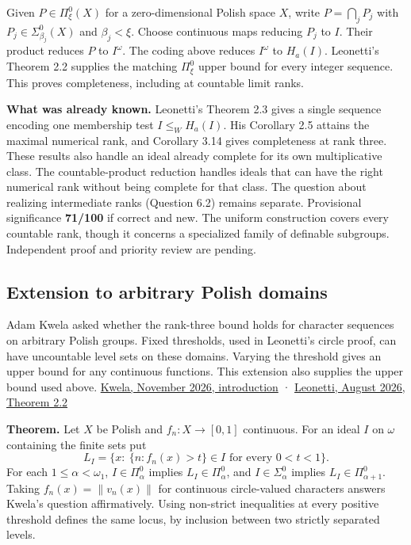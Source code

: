 \documentclass[11pt]{article}
\begin{document}
Given \(P\in\Pi^0_\xi(X)\) for a zero-dimensional Polish space \(X\), write \(P=\bigcap_j P_j\) with \(P_j\in\Sigma^0_{\beta_j}(X)\) and \(\beta_j<\xi\). Choose continuous maps reducing \(P_j\) to \(I\). Their product reduces \(P\) to \(I^\omega\). The coding above reduces \(I^\omega\) to \(H_a(I)\). Leonetti's Theorem 2.2 supplies the matching \(\Pi^0_\xi\) upper bound for every integer sequence. This proves completeness, including at countable limit ranks.

\textbf{What was already known.} Leonetti's Theorem 2.3 gives a single sequence encoding one membership test \(I\le_W H_a(I)\). His Corollary 2.5 attains the maximal numerical rank, and Corollary 3.14 gives completeness at rank three. These results also handle an ideal already complete for its own multiplicative class. The countable-product reduction handles ideals that can have the right numerical rank without being complete for that class. The question about realizing intermediate ranks (Question 6.2) remains separate. Provisional significance \textbf{71/100} if correct and new. The uniform construction covers every countable rank, though it concerns a specialized family of definable subgroups. Independent proof and priority review are pending.

\subsection{Extension to arbitrary Polish domains}\label{extension-to-arbitrary-polish-domains}

Adam Kwela asked whether the rank-three bound holds for character sequences on arbitrary Polish groups. Fixed thresholds, used in Leonetti's circle proof, can have uncountable level sets on these domains. Varying the threshold gives an upper bound for any continuous functions. This extension also supplies the upper bound used above. \href{https://arxiv.org/abs/2611.03432}{Kwela, November 2026, introduction} · \href{https://arxiv.org/abs/2608.23801}{Leonetti, August 2026, Theorem 2.2}

\textbf{Theorem.} Let \(X\) be Polish and \(f_n:X\to[0,1]\) continuous. For an ideal \(I\) on \(\omega\) containing the finite sets put \[ L_I=\{x:\ \{n:f_n(x)>t\}\in I\text{ for every }0<t<1\}. \] For each \(1\le\alpha<\omega_1\), \(I\in\Pi^0_\alpha\) implies \(L_I\in\Pi^0_\alpha\), and \(I\in\Sigma^0_\alpha\) implies \(L_I\in\Pi^0_{\alpha+1}\). Taking \(f_n(x)=\|v_n(x)\|\) for continuous circle-valued characters answers Kwela's question affirmatively. Using non-strict inequalities at every positive threshold defines the same locus, by inclusion between two strictly separated levels.
\end{document}
